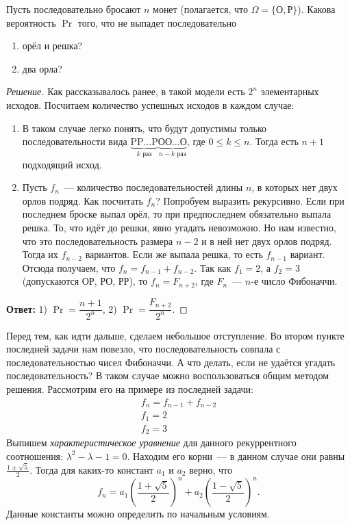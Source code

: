 \begin{problem}
    Пусть последовательно бросают \(n\) монет (полагается, что \(\Omega = \{\text{О}, \text{Р}\}\)). Какова вероятность \(\Pr\) того, что не выпадет последовательно
    \begin{enumerate}
        \item орёл и решка?
        \item два орла?
    \end{enumerate}
\end{problem}
\begin{proof}[Решение]
    Как рассказывалось ранее, в такой модели есть \(2^n\) элементарных исходов. Посчитаем количество успешных исходов в каждом случае:
    \begin{enumerate}
        \item В таком случае легко понять, что будут допустимы только последовательности вида \(\underbrace{\text{P}\text{P}\ldots\text{P}}_{k\text{ раз}}\underbrace{\text{О}\text{О}\ldots\text{О}}_{n - k\text{ раз}}\), где \(0 \leq k \leq n\). Тогда есть \(n + 1\) подходящий исход.
        
        \item Пусть \(f_n\)~--- количество последовательностей длины \(n\), в которых нет двух орлов подряд. Как посчитать \(f_n\)? Попробуем выразить рекурсивно. Если при последнем броске выпал орёл, то при предпоследнем обязательно выпала решка. То, что идёт до решки, явно угадать невозможно. Но нам известно, что это последовательность размера \(n - 2\) и в ней нет двух орлов подряд. Тогда их \(f_{n - 2}\) вариантов. Если же выпала решка, то есть \(f_{n - 1}\) вариант. Отсюда получаем, что \(f_{n} = f_{n - 1} + f_{n - 2}\). Так как \(f_1 = 2\), а \(f_2 = 3\) (допускаются ОР, РО, РР), то \(f_n = F_{n + 2}\), где \(F_n\)~--- \(n\)-е число Фибоначчи.
    \end{enumerate}
    \textbf{Ответ:} 1) \(\Pr = \dfrac{n + 1}{2^n}\), 2) \(\Pr = \dfrac{F_{n + 2}}{2^n}\).
\end{proof}

Перед тем, как идти дальше, сделаем небольшое отступление. Во втором пункте последней задачи нам повезло, что последовательность совпала с последовательностью чисел Фибоначчи. А что делать, если не удаётся угадать последовательность? В таком случае можно воспользоваться общим методом решения. Рассмотрим его на примере из последней задачи:
\[\begin{array}{l}
f_{n} = f_{n - 1} + f_{n - 2} \\
f_{1} = 2 \\
f_{2} = 3
\end{array}\]
Выпишем \emph{характеристическое уравнение} для данного рекуррентного соотношения: \(\lambda^2 - \lambda - 1 = 0\). Находим его корни~--- в данном случае они равны \(\frac{1 \pm \sqrt{5}}{2}\). Тогда для каких-то констант \(a_1\) и \(a_2\) верно, что \[f_{n} = a_1\left(\frac{1 + \sqrt{5}}{2}\right)^n + a_2\left(\frac{1 - \sqrt{5}}{2}\right)^n.\]
Данные константы можно определить по начальным условиям.

